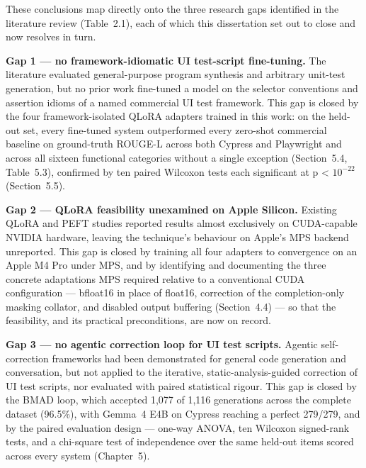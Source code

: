 These conclusions map directly onto the three research gaps identified
in the literature review (Table~2.1), each of which this dissertation
set out to close and now resolves in turn.

\textbf{Gap 1 --- no framework-idiomatic UI test-script fine-tuning.}
The literature evaluated general-purpose program synthesis and
arbitrary unit-test generation, but no prior work fine-tuned a model on
the selector conventions and assertion idioms of a named commercial UI
test framework. This gap is closed by the four framework-isolated QLoRA
adapters trained in this work: on the held-out set, every fine-tuned
system outperformed every zero-shot commercial baseline on ground-truth
ROUGE-L across both Cypress and Playwright and across all sixteen
functional categories without a single exception (Section~5.4,
Table~5.3), confirmed by ten paired Wilcoxon tests each significant at p
\textless{} $10^{-22}$ (Section~5.5).

\textbf{Gap 2 --- QLoRA feasibility unexamined on Apple Silicon.}
Existing QLoRA and PEFT studies reported results almost exclusively on
CUDA-capable NVIDIA hardware, leaving the technique's behaviour on
Apple's MPS backend unreported. This gap is closed by training all four
adapters to convergence on an Apple M4 Pro under MPS, and by identifying
and documenting the three concrete adaptations MPS required relative to
a conventional CUDA configuration --- bfloat16 in place of float16,
correction of the completion-only masking collator, and disabled output
buffering (Section~4.4) --- so that the feasibility, and its practical
preconditions, are now on record.

\textbf{Gap 3 --- no agentic correction loop for UI test scripts.}
Agentic self-correction frameworks had been demonstrated for general
code generation and conversation, but not applied to the iterative,
static-analysis-guided correction of UI test scripts, nor evaluated with
paired statistical rigour. This gap is closed by the BMAD loop, which
accepted 1{,}077 of 1{,}116 generations across the complete dataset
(96.5\%), with Gemma~4 E4B on Cypress reaching a perfect 279/279, and by
the paired evaluation design --- one-way ANOVA, ten Wilcoxon signed-rank
tests, and a chi-square test of independence over the same held-out
items scored across every system (Chapter~5).

